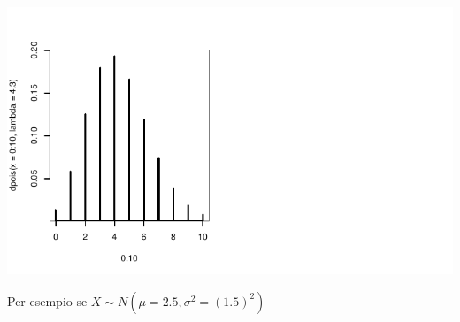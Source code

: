 \documentclass[
  11pt,
]{book}
\theoremstyle{mytheoremstyle}
\theoremstyle{mydefstyle}
\begin{document}
\begin{center}\includegraphics{Appunti_di_Statistica_2025_files/figure-latex/24-Libro-41-1} \end{center}

Per esempio se \(X\sim N(\mu=2.5,\sigma^2=(1.5)^2)\)
\end{document}
